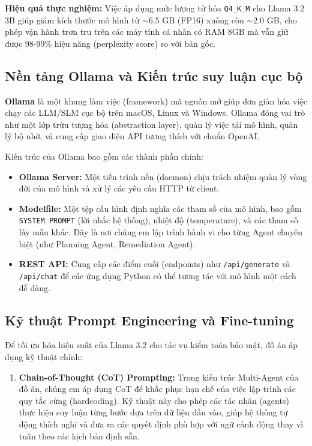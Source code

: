 \textbf{Hiệu quả thực nghiệm:}
Việc áp dụng mức lượng tử hóa \texttt{Q4\_K\_M} cho Llama 3.2 3B giúp giảm kích thước mô hình từ $\sim 6.5$ GB (FP16) xuống còn $\sim 2.0$ GB, cho phép vận hành trơn tru trên các máy tính cá nhân có RAM 8GB mà vẫn giữ được 98-99\% hiệu năng (perplexity score) so với bản gốc.
\subsection{Nền tảng Ollama và Kiến trúc suy luận cục bộ}
\textbf{Ollama} là một khung làm việc (framework) mã nguồn mở giúp đơn giản hóa việc chạy các LLM/SLM cục bộ trên macOS, Linux và Windows. Ollama đóng vai trò như một lớp trừu tượng hóa (abstraction layer), quản lý việc tải mô hình, quản lý bộ nhớ, và cung cấp giao diện API tương thích với chuẩn OpenAI.

Kiến trúc của Ollama bao gồm các thành phần chính:
\begin{itemize}
    \item \textbf{Ollama Server:} Một tiến trình nền (daemon) chịu trách nhiệm quản lý vòng đời của mô hình và xử lý các yêu cầu HTTP từ client.
    \item \textbf{Modelfile:} Một tệp cấu hình định nghĩa các tham số của mô hình, bao gồm \texttt{SYSTEM PROMPT} (lời nhắc hệ thống), nhiệt độ (temperature), và các tham số lấy mẫu khác. Đây là nơi chúng em lập trình hành vi cho từng Agent chuyên biệt (như Planning Agent, Remediation Agent).
    \item \textbf{REST API:} Cung cấp các điểm cuối (endpoints) như \texttt{/api/generate} và \texttt{/api/chat} để các ứng dụng Python có thể tương tác với mô hình một cách dễ dàng.
\end{itemize}

\subsection{Kỹ thuật Prompt Engineering và Fine-tuning}
Để tối ưu hóa hiệu suất của Llama 3.2 cho tác vụ kiểm toán bảo mật, đồ án áp dụng  kỹ thuật chính:
\begin{enumerate}
    \item \textbf{Chain-of-Thought (CoT) Prompting:} Trong kiến trúc Multi-Agent của đồ án, chúng em áp dụng CoT để khắc phục hạn chế của việc lập trình các quy tắc cứng (hardcoding). Kỹ thuật này cho phép các tác nhân (agents) thực hiện suy luận từng bước dựa trên dữ liệu đầu vào, giúp hệ thống tự động thích nghi và đưa ra các quyết định phù hợp với ngữ cảnh động thay vì tuân theo các kịch bản định sẵn.\end{enumerate}
